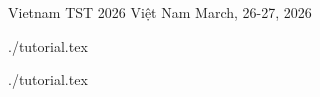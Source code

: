 \documentclass [11pt, a4paper, oneside] {article}
\begin{document}
\contest
{Vietnam TST 2026}%
{Việt Nam}%
{March, 26-27, 2026}%


\renewcommand{\t}{\texttt}
\renewcommand{\thefootnote}{\fnsymbol{footnote}}


    \def\ProblemIndex{C}
\graphicspath{{../../problems/vnm-tst-26-magician/statements/vietnamese/}}
{./tutorial.tex}
    \def\ProblemIndex{E}
\graphicspath{{../../problems/vnm-tst-26-vmachine/statements/vietnamese/}}
{./tutorial.tex}
\end{document}
